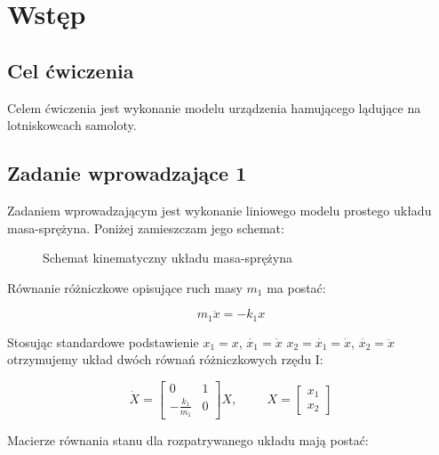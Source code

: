 \documentclass[12pt]{article}
\begin{document}


\section{Wstęp}

\subsection{Cel ćwiczenia}
Celem ćwiczenia jest wykonanie modelu urządzenia hamującego lądujące na
lotniskowcach samoloty.

\subsection{Zadanie wprowadzające 1}

Zadaniem wprowadzającym jest wykonanie liniowego modelu prostego układu
masa-sprężyna. Poniżej zamieszczam jego schemat:

\begin{figure}[!htb] 
	\begin{center}
		
		\caption{Schemat kinematyczny układu masa-sprężyna}
		\label{rys:wpr_spr_sch} 
	\end{center}
\end{figure}

Równanie różniczkowe opisujące ruch masy $m_1$ ma postać:

\begin{equation}
	m_1\ddot{x}=-k_1x
\end{equation}

Stosując standardowe podstawienie $x_1 = x$, $\dot{x_1} = \dot{x}$ $x_2 =
\dot{x_1} = \dot{x}$, $\dot{x_2} = \ddot{x}$ otrzymujemy układ dwóch równań
różniczkowych rzędu I:

\begin{equation}
	\dot{X} =
	\begin{bmatrix}
		0 & 1 \\
		-\frac{k_1}{m_1} & 0
	\end{bmatrix}
	X, \hspace{1cm}
	X =
	\begin{bmatrix}
		x_1 \\
		x_2
	\end{bmatrix}
\end{equation}

Macierze równania stanu dla rozpatrywanego układu mają postać:
\end{document}
